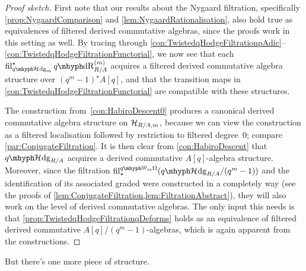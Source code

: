 \documentclass[DIV=12,numbers=enddot,leqno,bibliography=totoc]{scrartcl}
\begin{document}
	\begin{proof}[Proof sketch]
		First note that our results about the Nygaard filtration, specifically \cref{prop:NygaardComparison} and \cref{lem:NygaardRationalisation}, also hold true as equivalences of filtered derived commutative algebras, since the proofs work in this setting as well. By tracing through \cref{con:TwistedqHodgeFiltrationpAdic}--\cref{con:TwistedqHodgeFiltrationFunctorial}, we now see that each $ \fil_{\qHhodge_m}^\star \qdeRham_{R/A}^{(m)}$ acquires a filtered derived commutative algebra structure over $(q^m-1)^\star A[q]$, and that the transition maps in \cref{con:TwistedqHodgeFiltrationFunctorial} are compatible with these structures.
		
		The construction from~\cref{con:HabiroDescent0} produces a canonical derived commutative algebra structure on $\mathcal{H}_{R/A,  m}$, because we can view the construction as a filtered localisation followed by restriction to filtered degree~$0$; compare \cref{par:ConjugateFiltration}. It is then clear from \cref{con:HabiroDescent} that $\qHhodge_{R/A}$ acquires a derived commutative $A[q]$-algebra structure. Moreover, since the filtration $ \fil_\star^{\qIW_m\Omega}(\qHhodge_{R/A}/(q^m-1))$ and the identification of its associated graded were constructed in a completely way (see the proofs of \cref{lem:ConjugateFiltration,lem:FiltrationAbstract}), they will also work on the level of derived commutative algebras. The only input this needs is that \cref{prop:TwistedqHodgeFiltrationqDeforms} holds as an equivalence of filtered derived commutative $A[q]/(q^m-1)$-algebras, which is again apparent from the constructions.
	\end{proof}
	
	But there's one more piece of structure.
	
\end{document}
